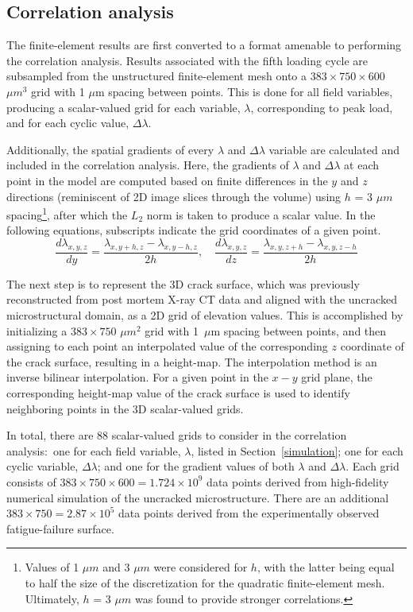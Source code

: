\subsection{Correlation analysis}\label{correlation_analysis}
The finite-element results are first converted to a format amenable to performing the correlation analysis. Results associated with the fifth loading cycle are subsampled from the unstructured finite-element mesh onto a $383 \times 750 \times 600$ $\mu m^3$ grid with 1 $\mu$m spacing between points. This is done for all field variables, producing a scalar-valued grid for each variable, $\lambda$, corresponding to peak load, and for each cyclic value, $\Delta\lambda$.

Additionally, the spatial gradients of every $\lambda$ and $\Delta\lambda$ variable are calculated and included in the correlation analysis. Here, the gradients of $\lambda$ and $\Delta\lambda$ at each point in the model are computed based on finite differences in the $y$ and $z$ directions (reminiscent of 2D image slices through the volume) using $h$ = 3 $\mu m$ spacing\footnote{Values of 1 $\mu m$ and 3 $\mu m$ were considered for $h$, with the latter being equal to half the size of the discretization for the quadratic finite-element mesh. Ultimately, $h$ = 3 $\mu m$ was found to provide stronger correlations.}, after which the $L_2$ norm is taken to produce a scalar value. In the following equations, subscripts indicate the grid coordinates of a given point.
\begin{equation}
\frac{d\lambda_{x, y, z}}{dy} = \frac{\lambda_{x, y+h, z} - \lambda_{x, y-h, z}}{2h}, \quad 
\frac{d\lambda_{x, y, z}}{dz} = \frac{\lambda_{x, y, z+h} - \lambda_{x, y, z-h}}{2h}  \end{equation}

The next step is to represent the 3D crack surface, which was previously reconstructed from post mortem X-ray CT data and aligned with the uncracked microstructural domain, as a 2D grid of elevation values. This is accomplished by initializing a $383 \times 750$ $\mu m^2$ grid with 1~$\mu$m spacing between points, and then assigning to each point an interpolated value of the corresponding $z$ coordinate of the crack surface, resulting in a height-map. The interpolation method is an inverse bilinear interpolation. For a given point in the $x-y$ grid plane, the corresponding height-map value of the crack surface is used to identify neighboring points in the 3D scalar-valued grids. 

In total, there are 88 scalar-valued grids to consider in the correlation analysis:~one for each field variable, $\lambda$, listed in Section~\ref{simulation}; one for each cyclic variable, $\Delta \lambda$; and one for the gradient values of both $\lambda$ and $\Delta \lambda$. Each grid consists of $383 \times 750 \times 600 = 1.724\times 10^{9}$ data points derived from high-fidelity numerical simulation of the uncracked microstructure. There are an additional $383 \times 750 = 2.87\times 10^{5}$ data points derived from the experimentally observed fatigue-failure surface.

